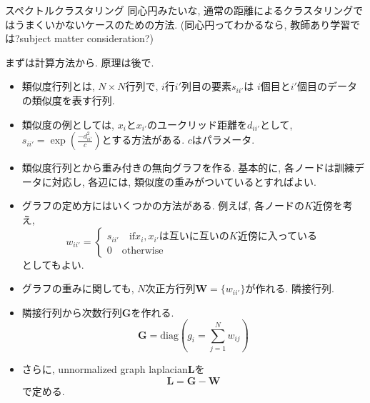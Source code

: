 \documentclass[dvipdfmx,8pt]{beamer}
\begin{document}
  \begin{frame}{スペクトルクラスタリング}
    同心円みたいな, 通常の距離によるクラスタリングではうまくいかないケースのための方法.
    (同心円ってわかるなら, 教師あり学習では?subject matter consideration?)

    まずは計算方法から. 原理は後で.
    \begin{itemize}
      \item 類似度行列とは, $N\times N$行列で, $i$行$i'$列目の要素$s_{ii'}$は
        $i$個目と$i'$個目のデータの類似度を表す行列.
      \item 類似度の例としては, $x_i$と$x_{i'}$のユークリッド距離を$d_{ii'}$として,
        $s_{ii'}=\exp(\frac{-d_{ii'}^2}{c})$とする方法がある. $c$はパラメータ.
      \item 類似度行列とから重み付きの無向グラフを作る.
        基本的に, 各ノードは訓練データに対応し, 各辺には, 類似度の重みがついているとすればよい.
      \item グラフの定め方にはいくつかの方法がある. 例えば, 各ノードの$K$近傍を考え,
        \[
          w_{ii'}=
          \begin{cases}
            s_{ii'} \quad \mbox{if} x_i, x_{i'}\mbox{は互いに互いの}K\mbox{近傍に入っている}\\
            0 \quad \mbox{otherwise}
          \end{cases}
        \]
        としてもよい.
      \item グラフの重みに関しても, $N$次正方行列$\mathbf{W}=\{w_{ii'}\}$が作れる. 隣接行列.
      \item 隣接行列から次数行列$\mathbf{G}$を作れる.
        \[
          \mathbf{G}=\mathrm{diag}\left(g_i=\sum_{j=1}^Nw_{ij}\right)
        \]
    \item さらに, unnormalized graph laplacian$\mathbf{L}$を
      \[
        \mathbf{L}=\mathbf{G}-\mathbf{W}
      \]
      で定める.

    \end{itemize}
  \end{frame}
\end{document}
